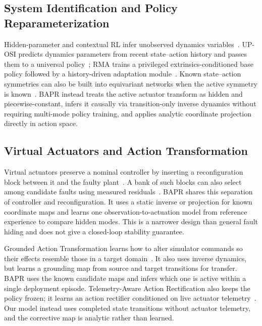 \documentclass[twoside,11pt]{article}
\begin{document}
\subsection{System Identification and Policy Reparameterization}

Hidden-parameter and contextual RL infer unobserved dynamics variables~\citep{Doshi-Velez2016HiPMDP,Benjamins2021CARL}. UP-OSI predicts dynamics parameters from recent state--action history and passes them to a universal policy~\citep{Yu2017UPOSI}; RMA trains a privileged extrinsics-conditioned base policy followed by a history-driven adaptation module~\citep{Kumar2021RMA}. Known state--action symmetries can also be built into equivariant networks when the active symmetry is known~\citep{VanderPol2020MDPHomomorphic}. BAPR instead treats the active actuator transform as hidden and piecewise-constant, infers it causally via transition-only inverse dynamics without requiring multi-mode policy training, and applies analytic coordinate projection directly in action space.

\subsection{Virtual Actuators and Action Transformation}

Virtual actuators preserve a nominal controller by inserting a reconfiguration block between it and the faulty plant~\citep{LunzeSteffen2003VirtualActuator}. A bank of such blocks can also select among candidate faults using measured residuals~\citep{Seron2011VirtualActuatorBank}. BAPR shares this separation of controller and reconfiguration. It uses a static inverse or projection for known coordinate maps and learns one observation-to-actuation model from reference experience to compare hidden modes. This is a narrower design than general fault hiding and does not give a closed-loop stability guarantee.

Grounded Action Transformation learns how to alter simulator commands so their effects resemble those in a target domain~\citep{Hanna2021GAT}. It also uses inverse dynamics, but learns a grounding map from source and target transitions for transfer. BAPR uses the known candidate maps and infers which one is active within a single deployment episode. Telemetry-Aware Action Rectification also keeps the policy frozen; it learns an action rectifier conditioned on live actuator telemetry~\citep{Sagar2026TeAR}. Our model instead uses completed state transitions without actuator telemetry, and the corrective map is analytic rather than learned.
\end{document}
